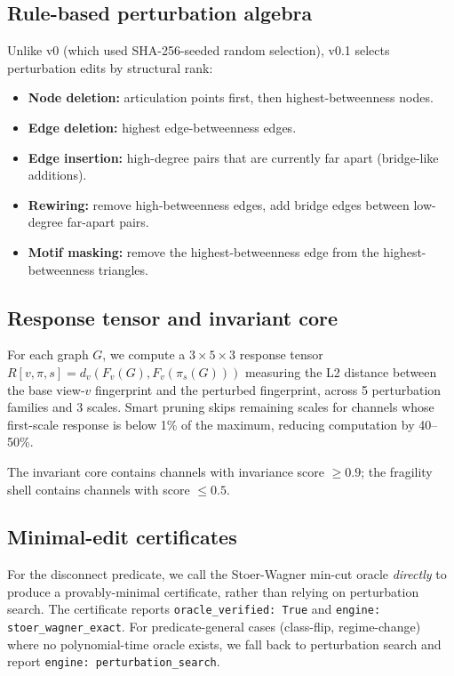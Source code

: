 \documentclass[11pt]{article}
\begin{document}
\subsection{Rule-based perturbation algebra}

Unlike v0 (which used SHA-256-seeded random selection), v0.1 selects perturbation edits by structural rank:
\begin{itemize}
    \item \textbf{Node deletion:} articulation points first, then highest-betweenness nodes.
    \item \textbf{Edge deletion:} highest edge-betweenness edges.
    \item \textbf{Edge insertion:} high-degree pairs that are currently far apart (bridge-like additions).
    \item \textbf{Rewiring:} remove high-betweenness edges, add bridge edges between low-degree far-apart pairs.
    \item \textbf{Motif masking:} remove the highest-betweenness edge from the highest-betweenness triangles.
\end{itemize}

\subsection{Response tensor and invariant core}

For each graph $G$, we compute a $3 \times 5 \times 3$ response tensor $R[v, \pi, s] = d_v(F_v(G), F_v(\pi_s(G)))$ measuring the L2 distance between the base view-$v$ fingerprint and the perturbed fingerprint, across 5 perturbation families and 3 scales. Smart pruning skips remaining scales for channels whose first-scale response is below 1\% of the maximum, reducing computation by 40--50\%.

The invariant core contains channels with invariance score $\geq 0.9$; the fragility shell contains channels with score $\leq 0.5$.

\subsection{Minimal-edit certificates}

For the disconnect predicate, we call the Stoer-Wagner min-cut oracle \emph{directly} to produce a provably-minimal certificate, rather than relying on perturbation search. The certificate reports \texttt{oracle\_verified: True} and \texttt{engine: stoer\_wagner\_exact}. For predicate-general cases (class-flip, regime-change) where no polynomial-time oracle exists, we fall back to perturbation search and report \texttt{engine: perturbation\_search}.
\end{document}
